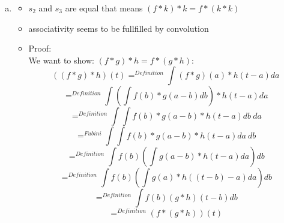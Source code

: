 \documentclass[12pt]{article}
\begin{document}
\begin{enumerate}[a)]
\item 
\begin{itemize}
	\item $s_2$ and $s_3$ are equal that means $(f*k)*k=f*(k*k)$
	\item associativity seems to be fullfilled by convolution
	\item Proof:\\
	We want to show: $(f*g)*h=f*(g*h)$:\\
	$$((f*g)*h)(t) =^{Definition} \int (f*g)(a)*h(t-a) da $$
	$$ =^{Definition} \int (\int f(b)*g(a-b) db)*h(t-a) da $$
	$$=^{Definition}\int \int f(b)*g(a-b)*h(t-a) db~ da $$
	$$=^{Fubini} \int \int f(b)*g(a-b)*h(t-a) da~ db$$
	$$=^{Definition} \int f(b) (\int g(a-b)*h(t-a) da) db$$
	$$=^{Definition} \int f(b)(\int g(a) * h((t-b)-a) da) db $$
	$$=^{Definition} \int f(b) (g*h)(t-b) db$$
	$$=^{Definition} (f*(g*h))(t) $$
\end{itemize}
\end{enumerate}


\newpage
\end{document}
